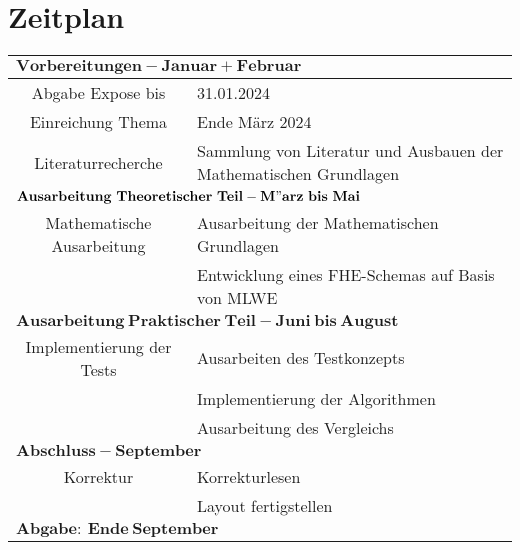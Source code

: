 \chapter{Zeitplan}
\label{Zeitplan}

\begin{tabular}{|c | p{10cm} |}
  \toprule
  \multicolumn{2}{|l|}{$\mathbf{Vorbereitungen - Januar+Februar}$}                               \\
  \midrule
  Abgabe Expose bis          & 31.01.2024                                                        \\
  Einreichung Thema          & Ende März 2024                                                   \\
  Literaturrecherche         & Sammlung von Literatur und Ausbauen der Mathematischen Grundlagen \\
  \midrule
  \multicolumn{2}{|l|}{$\mathbf{Ausarbeitung~Theoretischer~Teil - M"arz~bis~Mai}$}                \\
  \midrule
  Mathematische Ausarbeitung & Ausarbeitung der Mathematischen Grundlagen                        \\
                             & Entwicklung eines FHE-Schemas auf Basis von MLWE                  \\
  \midrule
  \multicolumn{2}{|l|}{$\mathbf{Ausarbeitung~Praktischer~Teil - Juni~bis~August}$}               \\
  \midrule
  Implementierung der Tests  & Ausarbeiten des Testkonzepts                                      \\
                             & Implementierung der Algorithmen                                   \\
                             & Ausarbeitung des Vergleichs                                       \\
  \midrule
  \multicolumn{2}{|l|}{$\mathbf{Abschluss - September}$}                                         \\
  \midrule
  Korrektur                  & Korrekturlesen                                                    \\
                             & Layout fertigstellen                                              \\
  \midrule
  \multicolumn{2}{|l|}{$\mathbf{Abgabe:~Ende~September}$}                                         \\
  \bottomrule                                                    
\end{tabular}
